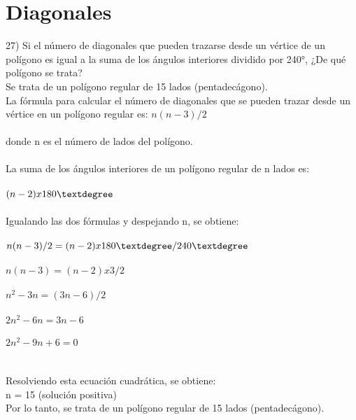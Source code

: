 \documentclass{article}
\begin{document}
\section*{\large\textbf{Diagonales}}
27) Si el número de diagonales que pueden trazarse desde un vértice de un polígono es igual a la suma de los ángulos interiores dividido por 240°, ¿De qué polígono se trata?\\
Se trata de un polígono regular de 15 lados (pentadecágono).\\
La fórmula para calcular el número de diagonales que se pueden trazar desde un vértice en un polígono regular es: $n(n-3)/2$\\
\\
donde n es el número de lados del polígono.\\
\\
La suma de los ángulos interiores de un polígono regular de n lados es:\\
\\
$(n-2) x 180\textdegree$\\
\\
Igualando las dos fórmulas y despejando n, se obtiene:\\
\\
$n(n-3)/2 = (n-2) x 180\textdegree / 240\textdegree$\\
\\
$n(n-3) = (n-2) x 3/2$\\
\\
$n^2 - 3n = (3n - 6) / 2$\\
\\
$2n^2 - 6n = 3n - 6$\\
\\
$2n^2 - 9n + 6 = 0$\\
\\
\\
Resolviendo esta ecuación cuadrática, se obtiene:\\
n = 15 (solución positiva)\\
Por lo tanto, se trata de un polígono regular de 15 lados (pentadecágono).\\
\end{document}
